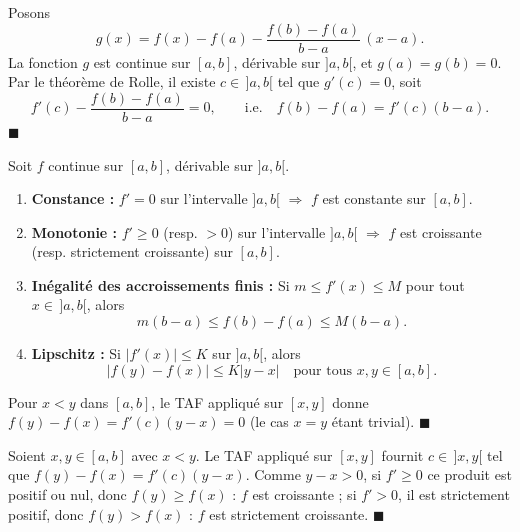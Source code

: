 \begin{mdframed}[style=proofbar]
  Posons
  \[
    g(x) = f(x) - f(a) - \frac{f(b)-f(a)}{b-a}\,(x-a).
  \]
  La fonction $g$ est continue sur $[a,b]$, dérivable sur $]a,b[$, et
  $g(a) = g(b) = 0$.
  Par le théorème de Rolle, il existe $c \in\, ]a,b[$
  tel que $g'(c)=0$, soit
  \[
    f'(c) - \frac{f(b)-f(a)}{b-a} = 0,
    \qquad\text{i.e.}\quad f(b)-f(a) = f'(c)(b-a).
  \]
  \hfill$\blacksquare$
\end{mdframed}

\decsep{}


\begin{tcolorbox}[thmbox]
  Soit $f$ continue sur $[a,b]$, dérivable sur $]a,b[$.
  \begin{enumerate}
    \item \textbf{Constance :} $f' = 0$ sur l'intervalle $]a,b[$ $\Rightarrow$ $f$ est
          constante sur $[a,b]$.
    \item \textbf{Monotonie :} $f' \geq 0$ (resp. $> 0$) sur l'intervalle $]a,b[$
          $\Rightarrow$ $f$ est croissante (resp. strictement croissante) sur $[a,b]$.
    \item \textbf{Inégalité des accroissements finis :}
    Si $m \leq f'(x) \leq M$ pour tout $x \in\, ]a,b[$, alors
    \[
      m(b-a) \leq f(b)-f(a) \leq M(b-a).
    \]
    \item \textbf{Lipschitz :}
    Si $|f'(x)| \leq K$ sur $]a,b[$, alors
    \[
      |f(y)-f(x)| \leq K|y-x| \quad\text{pour tous } x,y \in [a,b].
    \]
  \end{enumerate}
\end{tcolorbox}


\begin{mdframed}[style=proofbar]
  Pour $x < y$ dans $[a,b]$, le TAF appliqué sur $[x,y]$ donne
  $f(y)-f(x) = f'(c)(y-x) = 0$ (le cas $x = y$ étant trivial). \hfill$\blacksquare$
\end{mdframed}


\begin{mdframed}[style=proofbar]
  Soient $x,y \in [a,b]$ avec $x<y$. Le TAF appliqué sur $[x,y]$ fournit
  $c \in\, ]x,y[$ tel que $f(y)-f(x) = f'(c)(y-x)$. Comme $y-x>0$, si $f'\geq 0$
  ce produit est positif ou nul, donc $f(y)\geq f(x)$ : $f$ est croissante ;
  si $f'>0$, il est strictement positif, donc $f(y)>f(x)$ : $f$ est strictement
  croissante. \hfill$\blacksquare$
\end{mdframed}

